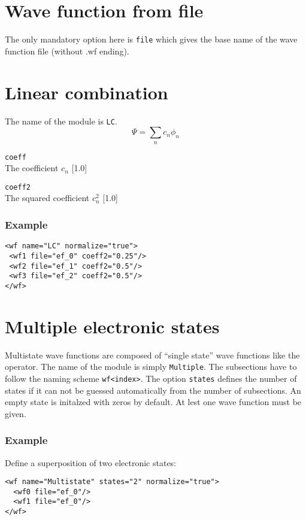 \documentclass[a4paper,12pt]{scrbook}
\newcommand{\option}[2]{\item \texttt{#1}\\ #2}
\begin{document}
\section{Wave function from file}
The only mandatory option here is \verb|file| which gives the base name of the wave function file
(without .wf ending).

\section{Linear combination}
The name of the module is \verb|LC|.
\begin{equation}
 \Psi = \sum_n c_n \phi_n
\end{equation}

\begin{options}
 \option{coeff}{The coefficient $c_n$ [1.0]}
 \option{coeff2}{The squared coefficient $c^2_n$ [1.0]}
\end{options}

\subsubsection*{Example}
\begin{verbatim}
<wf name="LC" normalize="true">
 <wf1 file="ef_0" coeff2="0.25"/>
 <wf2 file="ef_1" coeff2="0.5"/>
 <wf3 file="ef_2" coeff2="0.5"/>
</wf>
\end{verbatim}


\section{Multiple electronic states}
\label{sec:WFMultistate}

Multistate wave functions are composed of ``single state'' wave functions like the operator.
The name of the module is simply \verb|Multiple|. The subsections have to follow the naming
scheme \verb|wf<index>|. The option \verb|states| defines the number of states if it can not
be guessed automatically from the number of subsections. An empty state is initalzed with zeros
by default. At lest one wave function must be given.

\subsubsection*{Example}
Define a superposition of two electronic states:
\begin{verbatim}
<wf name="Multistate" states="2" normalize="true">
  <wf0 file="ef_0"/>
  <wf1 file="ef_0"/>
</wf>
\end{verbatim}





\end{document}
